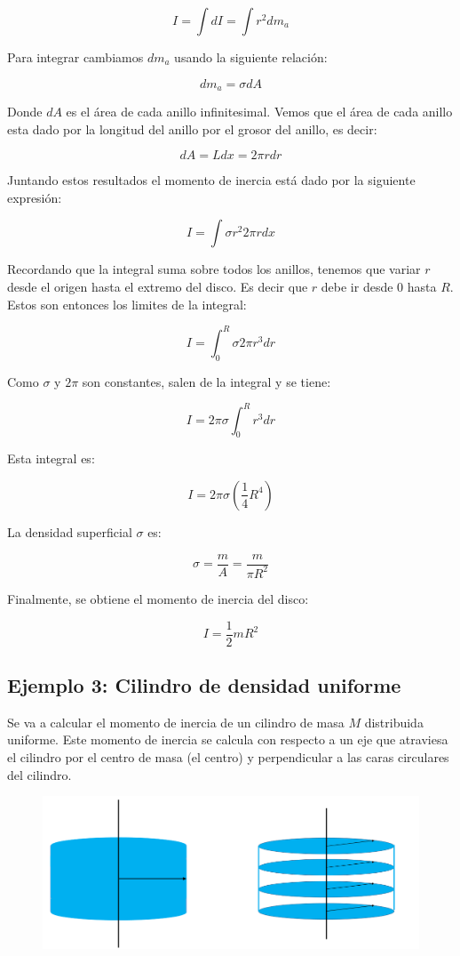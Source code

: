 \documentclass[a4paper,11pt]{article}
\begin{document}
$$ I = \int d I  = \int r^2 dm_a $$

Para integrar cambiamos $dm_a$ usando la siguiente relación:

$$ dm_a = \sigma dA$$

Donde $dA$ es el área de cada anillo infinitesimal. Vemos que el área de cada anillo esta dado por la longitud del anillo por el grosor del anillo, es decir:

$$ dA = L dx = 2 \pi r d r$$

Juntando estos resultados el momento de inercia está dado por la siguiente expresión:
 
$$ I = \int \sigma r^2 2 \pi r dx$$

Recordando que la integral suma sobre todos los anillos, tenemos que variar $r$ desde el origen hasta el extremo del disco. Es decir que $r$ debe ir desde $0$ hasta $R$. Estos son entonces los limites de la integral:

$$ I =  \int_{0}^{R} \sigma 2\pi   r^3 dr$$

Como $\sigma$ y $2\pi$ son constantes, salen de la integral y se tiene:

$$ I =  2\pi\sigma \int_{0}^{R}    r^3 dr$$

Esta integral es:

$$ I =  2\pi\sigma \left( \frac{1}{4} R^4\right)$$

La densidad superficial $\sigma$ es:

$$ \sigma = \frac{m}{A} = \frac{m}{\pi R^2} $$

Finalmente, se obtiene el momento de inercia del disco:

$$ I = \frac{1}{2} m R^2$$

\subsection{Ejemplo 3: Cilindro de densidad uniforme}

Se va a calcular el momento de inercia de un cilindro de masa $M$ distribuida uniforme. Este momento de inercia se calcula con respecto a un eje que atraviesa el cilindro por el centro de masa (el centro) y perpendicular a las caras circulares del cilindro.
\vspace{1cm}

\begin{figure}[h]
	\includegraphics[width=\linewidth]{./im/cilindro1}
	
\end{figure}
\end{document}
